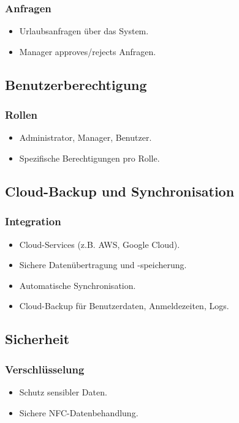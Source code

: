 \documentclass{article}
\begin{document}
\subsubsection*{Anfragen}
\begin{itemize}
  \item Urlaubsanfragen über das System.
  \item Manager approves/rejects Anfragen.
\end{itemize}

\subsection*{Benutzerberechtigung}

\subsubsection*{Rollen}
\begin{itemize}
  \item Administrator, Manager, Benutzer.
  \item Spezifische Berechtigungen pro Rolle.
\end{itemize}

\subsection*{Cloud-Backup und Synchronisation}

\subsubsection*{Integration}
\begin{itemize}
  \item Cloud-Services (z.B. AWS, Google Cloud).
  \item Sichere Datenübertragung und -speicherung.
  \item Automatische Synchronisation.
  \item Cloud-Backup für Benutzerdaten, Anmeldezeiten, Logs.
\end{itemize}

\subsection*{Sicherheit}

\subsubsection*{Verschlüsselung}
\begin{itemize}
  \item Schutz sensibler Daten.
  \item Sichere NFC-Datenbehandlung.
\end{itemize}
\end{document}
